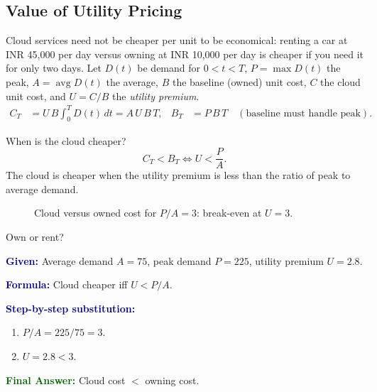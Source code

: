 \documentclass[11pt,a4paper,openany]{report}
\newcommand{\Given}{\par\textbf{\textcolor{navy}{Given:}} }
\newcommand{\Formula}{\par\textbf{\textcolor{navy}{Formula:}} }
\newcommand{\Steps}{\par\textbf{\textcolor{navy}{Step-by-step substitution:}}\par}
\newcommand{\Answer}{\par\textbf{\textcolor{darkgreen}{Final Answer:}} }
\begin{document}
\subsection{Value of Utility Pricing}
Cloud services need not be cheaper per unit to be economical: renting a car at INR 45,000 per day versus owning at INR 10,000 per day is
cheaper if you need it for only two days. Let $D(t)$ be demand for $0<t<T$, $P=\max D(t)$ the peak, $A=\operatorname{avg} D(t)$
the average, $B$ the baseline (owned) unit cost, $C$ the cloud unit cost, and $U = C/B$ the \emph{utility premium}.
\begin{align*}
 C_T &= U\,B\int_0^T D(t)\,dt = A\,U\,B\,T, &
 B_T &= P\,B\,T \quad(\text{baseline must handle peak}).
\end{align*}
\begin{thmbox}{When is the cloud cheaper?}
\[ C_T < B_T \iff U < \frac{P}{A}. \]
The cloud is cheaper when the utility premium is less than the ratio of peak to average demand.
\end{thmbox}

\begin{figure}[H]
\centering
{}
\caption{Cloud versus owned cost for $P/A = 3$: break-even at $U = 3$.}
\end{figure}

\begin{solved}{Own or rent?}
\Given Average demand $A = 75$, peak demand $P = 225$, utility premium $U = 2.8$.
\Formula Cloud cheaper iff $U < P/A$.
\Steps
\begin{enumerate}[leftmargin=*]
  \item $P/A = 225/75 = 3$.
  \item $U = 2.8 < 3$.
\end{enumerate}
\Answer Cloud cost $<$ owning cost.
\end{solved}
\end{document}
